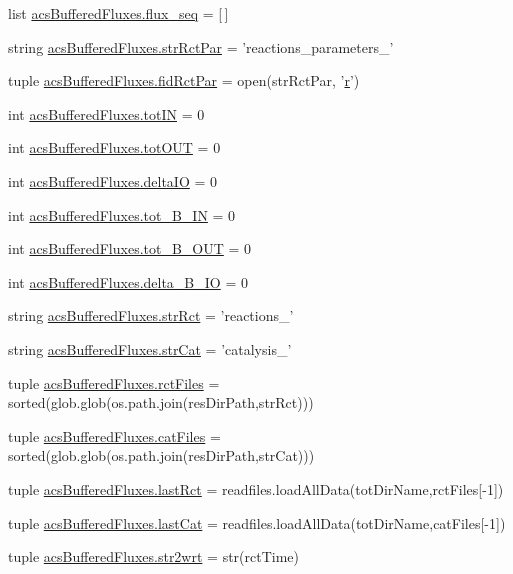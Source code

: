 \begin{DoxyCompactItemize}
\item 
list \hyperlink{a00126_a99cfaccf97d11133896704acd137057d}{acs\+Buffered\+Fluxes.\+flux\+\_\+seq} = \mbox{[}$\,$\mbox{]}
\item 
string \hyperlink{a00126_ac571c8d78a216f58ebc1e37bef25a541}{acs\+Buffered\+Fluxes.\+str\+Rct\+Par} = 'reactions\+\_\+parameters\+\_\+'
\item 
tuple \hyperlink{a00126_af949c46aab0625cd7bbed10b8a484f8b}{acs\+Buffered\+Fluxes.\+fid\+Rct\+Par} = open(str\+Rct\+Par, '\hyperlink{a00031_ac862e7284527eb913b1351c8bfb8e079}{r}')
\item 
int \hyperlink{a00126_a59bf56491943c5f1414e0cc407b48b93}{acs\+Buffered\+Fluxes.\+tot\+I\+N} = 0
\item 
int \hyperlink{a00126_a730efee103fd41819ea5848cec249d07}{acs\+Buffered\+Fluxes.\+tot\+O\+U\+T} = 0
\item 
int \hyperlink{a00126_ae98d1ab06ff5af93de3e406b69c0f890}{acs\+Buffered\+Fluxes.\+delta\+I\+O} = 0
\item 
int \hyperlink{a00126_a9212bb73d018f7f9c7112fc40900335c}{acs\+Buffered\+Fluxes.\+tot\+\_\+\+B\+\_\+\+I\+N} = 0
\item 
int \hyperlink{a00126_a05f604fc532aebf8d9418c9162e2c1b7}{acs\+Buffered\+Fluxes.\+tot\+\_\+\+B\+\_\+\+O\+U\+T} = 0
\item 
int \hyperlink{a00126_a28922506bb13e58a9c49c9191dee3784}{acs\+Buffered\+Fluxes.\+delta\+\_\+\+B\+\_\+\+I\+O} = 0
\item 
string \hyperlink{a00126_a8a10e31ae1f56ead45ef13fe84ba868f}{acs\+Buffered\+Fluxes.\+str\+Rct} = 'reactions\+\_\+'
\item 
string \hyperlink{a00126_acbfee694f1d4745446ad7ed83d1f7494}{acs\+Buffered\+Fluxes.\+str\+Cat} = 'catalysis\+\_\+'
\item 
tuple \hyperlink{a00126_a60a2c6fa1b6a8c5d40a751491ffd04e7}{acs\+Buffered\+Fluxes.\+rct\+Files} = sorted(glob.\+glob(os.\+path.\+join(res\+Dir\+Path,str\+Rct)))
\item 
tuple \hyperlink{a00126_a1d925f94f070fbec1b39c544176b3452}{acs\+Buffered\+Fluxes.\+cat\+Files} = sorted(glob.\+glob(os.\+path.\+join(res\+Dir\+Path,str\+Cat)))
\item 
tuple \hyperlink{a00126_a3f5f644008584b4ae3756ada869a8f03}{acs\+Buffered\+Fluxes.\+last\+Rct} = readfiles.\+load\+All\+Data(tot\+Dir\+Name,rct\+Files\mbox{[}-\/1\mbox{]})
\item 
tuple \hyperlink{a00126_a4b8fcacfa4d1a00c44c22118ca07688a}{acs\+Buffered\+Fluxes.\+last\+Cat} = readfiles.\+load\+All\+Data(tot\+Dir\+Name,cat\+Files\mbox{[}-\/1\mbox{]})
\item 
tuple \hyperlink{a00126_ae3cf837e258f4b4c7f2d2b1118d2ae65}{acs\+Buffered\+Fluxes.\+str2wrt} = str(rct\+Time)
\end{DoxyCompactItemize}
